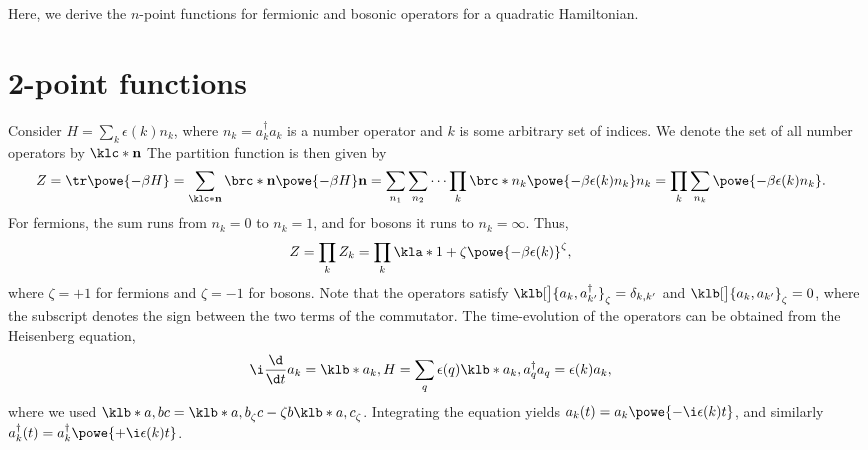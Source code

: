 \documentclass[english, parskip=full]{scrartcl}
\title{\Title}
\author{\Author}
\date{\today}
\begin{document}
\maketitle

Here, we derive the $n$-point functions for fermionic and bosonic operators for a quadratic Hamiltonian.
\section{2-point functions}
Consider $H=\sum_k \epsilon(k) n_k$, where $n_k=a_k^\dagger a_k$ is a number operator and $k$ is some arbitrary set of indices.
We denote the set of all number operators by $\klc*{\textbf{n}}$
The partition function is then given by
\begin{align}
Z &= \tr \powe{-\beta H} = \sum_{\klc*{\textbf{n}}} \brc*{\textbf{n}}{\powe{-\beta H}}{\textbf{n}} = \sum_{n_1} \sum_{n_2} \dots \prod_k \brc*{n_k}{\powe{-\beta \epsilon(k)n_k}}{n_k} = \prod_k \sum_{n_k} \powe{-\beta \epsilon(k)n_k}.
\end{align}
For fermions, the sum runs from $n_k=0$ to $n_k=1$, and for bosons it runs to $n_k=\infty$.
Thus,
\begin{align}
Z &= \prod_k Z_k = \prod_k \kla*{1 + \zeta \powe{-\beta \epsilon(k)}}^\zeta,
\end{align}
where $\zeta=+1$ for fermions and $\zeta=-1$ for bosons.
Note that the operators satisfy $\klb[\big]{a_k, a_{k'}^\dagger}_\zeta = \delta_{k,k'}$ and $\klb[\big]{a_k, a_{k'}}_\zeta = 0$, where the subscript denotes the sign between the two terms of the commutator.
The time-evolution of the operators can be obtained from the Heisenberg equation, 
\begin{align}
\i\frac{\d}{\d t} a_k &= \klb*{a_k, H} = \sum_q \epsilon(q) \klb*{a_k, a_q^\dagger a_q} = \epsilon(k)a_k,
\end{align}
where we used $\klb*{a, bc} = \klb*{a,b}_\zeta c - \zeta b\klb*{a,c}_\zeta$.
Integrating the equation yields $a_k(t) = a_k \powe{-\i \epsilon(k) t}$, and similarly $a_k^\dagger(t) = a_k^\dagger \powe{+\i\epsilon(k)t}$.
\end{document}
